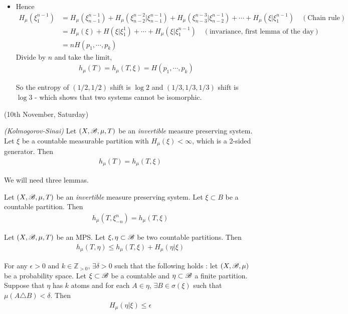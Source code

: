 \documentclass[10pt,a4paper]{report}
\newenvironment{subproof}
{\begin{changemargin}{0.5cm}{0.5cm}
	}%
	{\end{changemargin}
}
\begin{document}
\begin{itemize}
\begin{subproof}
\eop
\end{subproof}
\s

\item Hence
\begin{align*}
H_{\mu}(\xi_1^{n-1}) &= H_{\mu}(\xi_{n-1}^{n-1}) + H_{\mu}(\xi_{n-2}^{n-2} | \xi_{n-1}^{n-1}) + H_{\mu}(\xi_{n-3}^{n-3} | \xi_{n-2}^{n-1}) + \cdots + H_{\mu}(\xi | \xi^{n-1}_{1}) \quad (\text{Chain rule}) \\
&= H_{\mu}(\xi) + H(\xi |\xi_1^1) + \cdots + H_{\mu}(\xi | \xi_1^{n-1}) \quad (\text{invariance, first lemma of the day}) \\
&= nH(p_1, \cdots, p_k)
\end{align*}
Divide by $n$ and take the limit, 
\begin{align*}
h_{\mu}(T) = h_{\mu}(T,\xi) = H(p_1, \cdots, p_k)
\end{align*}

So the entropy of $(1/2,1/2)$ shift is $\log2$ and $(1/3,1/3,1/3)$ shift is $\log3$ - which shows that two systems cannot be isomorphic.
\end{itemize}
\s

\newday

(10th November, Saturday)
\s

\thm \emph{(Kolmogorov-Sinai)} Let $(X,\mathscr{B}, \mu, T)$ be an \emph{invertible} measure preserving system. Let $\xi$ be a countable measurable partition with $H_{\mu}(\xi) < \infty$, which is a 2-sided generator. Then
\begin{align*}
h_{\mu}(T) = h_{\mu}(T,\xi)
\end{align*}
\s

We will need three lemmas.
\s

 Let $(X,\mathscr{B}, \mu, T)$ be an \emph{invertible} measure preserving system. Let $\xi \subset B$ be a countable partition. Then
\begin{align*}
h_{\mu}(T, \xi^n_{-n}) = h_{\mu}(T,\xi)
\end{align*}
\s

 Let $(X,\mathscr{B}, \mu, T)$ be an MPS. Let $\xi, \eta \subset \mathscr{B}$ be two countable partitions. Then
\begin{align*}
h_{\mu}(T,\eta) \leq h_{\mu}(T, \xi) + H_{\mu}(\eta | \xi)
\end{align*}
\s

 For any $\epsilon>0$ and $k\in \mathbb{Z}_{>0}$, $\exists \delta >0$ such that the following holds : let $(X, \mathscr{B}, \mu)$ be a probability space. Let $\xi \subset \mathscr{B}$ be a countable and $\eta \subset \mathscr{B}$ a finite partition. Suppose that $\eta$ has $k$ atoms and for each $A\in \eta$, $\exists B\in \sigma(\xi)$ such that $\mu(A \triangle B) <\delta$. Then 
\begin{align*}
H_{\mu}(\eta | \xi) \leq \epsilon
\end{align*}
\s
\end{document}
